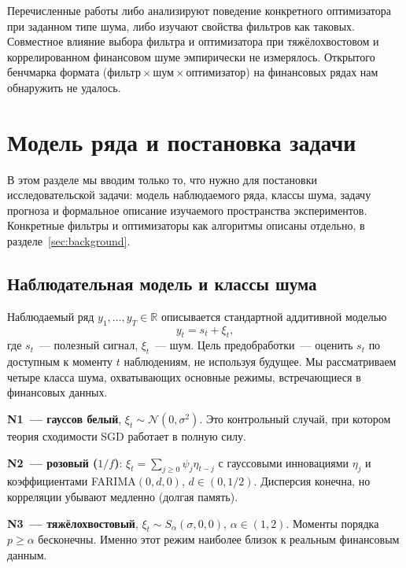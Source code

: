 \documentclass[conference]{IEEEtran}
\begin{document}
Перечисленные работы либо анализируют поведение конкретного оптимизатора
при заданном типе шума, либо изучают свойства фильтров как таковых.
Совместное влияние выбора фильтра и оптимизатора при тяжёлохвостовом и
коррелированном финансовом шуме эмпирически не измерялось. Открытого
бенчмарка формата (фильтр\,$\times$\,шум\,$\times$\,оптимизатор) на
финансовых рядах нам обнаружить не удалось.

\section{Модель ряда и постановка задачи}
\label{sec:setup}

В этом разделе мы вводим только то, что нужно для постановки
исследовательской задачи: модель наблюдаемого ряда, классы шума, задачу
прогноза и формальное описание изучаемого пространства экспериментов.
Конкретные фильтры и оптимизаторы как алгоритмы описаны отдельно, в
разделе~\ref{sec:background}.

\subsection{Наблюдательная модель и классы шума}

Наблюдаемый ряд $y_1,\dots,y_T\in\mathbb{R}$ описывается стандартной
аддитивной моделью
\begin{equation}
  y_t = s_t + \xi_t,
  \label{eq:model}
\end{equation}
где $s_t$~--- полезный сигнал, $\xi_t$~--- шум. Цель предобработки~---
оценить $s_t$ по доступным к моменту $t$ наблюдениям, не используя
будущее. Мы рассматриваем четыре класса шума, охватывающих основные
режимы, встречающиеся в финансовых данных.

\textbf{N1~--- гауссов белый}, $\xi_t\sim\mathcal{N}(0,\sigma^2)$. Это
контрольный случай, при котором теория сходимости SGD работает в полную
силу.

\textbf{N2~--- розовый ($1/f$)}: $\xi_t = \sum_{j\ge0}\psi_j\eta_{t-j}$ с
гауссовыми инновациями $\eta_j$ и коэффициентами FARIMA$(0,d,0)$,
$d\in(0,1/2)$. Дисперсия конечна, но корреляции убывают медленно (долгая
память).

\textbf{N3~--- тяжёлохвостовый}, $\xi_t\sim S_\alpha(\sigma,0,0)$,
$\alpha\in(1,2)$. Моменты порядка $p\ge\alpha$ бесконечны. Именно этот
режим наиболее близок к реальным финансовым данным.
\end{document}
